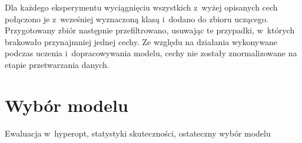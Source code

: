 Dla każdego eksperymentu wyciągnięciu wszystkich z~wyżej opisanych cech połączono je z~wcześniej wyznaczoną klasą i~dodano do zbioru uczącego. Przygotowany zbiór następnie przefiltrowano, usuwając te przypadki, w~których brakowało przynajmniej jednej cechy. Ze względu na działania wykonywane podczas uczenia i~dopracowywania modelu, cechy nie zostały znormalizowane na etapie przetwarzania danych.
\section{Wybór modelu}
Ewaluacja w~hyperopt, statystyki skuteczności, ostateczny wybór modelu